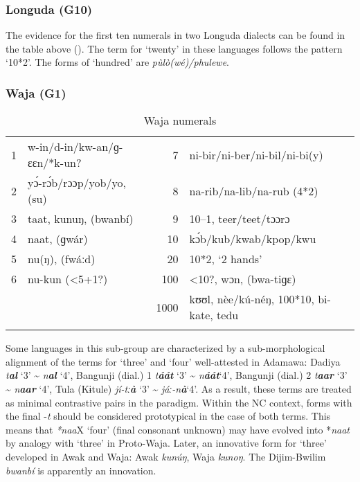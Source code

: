 \subsubsection{Longuda (G10)}%
The evidence for the first ten numerals in two Longuda dialects can be found in the table above (). The term for ‘twenty’ in these languages follows the pattern ‘10*2’.  The forms of ‘hundred’ are \textit{pùlò(wé)/phulewe}.

\subsubsection{Waja (G1)}%
\begin{table}
\caption{\label{tab:3:114}Waja numerals}


\begin{tabularx}{\textwidth}{llrX}
\lsptoprule

1 & w-in/d-in/kw-an/ɡ-ɛɛn/*k-un? & 7 & ni-bir/ni-ber/ni-bil/ni-bi(y)\\
2 & y{\'{ɔ}}-r{\'{ɔ}}b/rɔɔp/yob/yo, (su) & 8 & na-rib/na-lib/na-rub (4*2)\\
3 & taat, kunuŋ, (bwanbí) & 9 & 10--1, teer/teet/tɔɔrɔ\\
4 & naat, (ɡwár) & 10 & k{\'{ɔ}}b/kub/kwab/kpop/kwu\\
5 & nu(ŋ), (fwáːd) & 20 & 10*2, `2 hands'\\
6 & nu-kun (<5+1?) & 100 & <10?, wɔn, (bwa-tiɡɛ)\\
&  & 1000 & kʊʊl, nèe/kú-néŋ, 100*10, bi-kate, tedu\\
\lspbottomrule
\end{tabularx}
\end{table}

Some languages in this sub-group are characterized by a sub-morphological alignment of the terms for ‘three’ and ‘four’ well-attested in Adamawa: Dadiya \textit{t}\textbf{\textit{al} }‘3’ {\textasciitilde} \textit{n}\textbf{\textit{al}} ‘4’, Bangunji (dial.) 1 \textit{t}\textbf{\textit{áát}} ‘3’ {\textasciitilde} \textit{n}\textbf{\textit{áát}}‘4’, Bangunji (dial.) 2 \textit{t}\textbf{\textit{aar}} ‘3’ {\textasciitilde} \textit{n}\textbf{\textit{aar}} ‘4’, Tula (Kɨtule) \textit{jí-tː}\textbf{\textit{à}} ‘3’ {\textasciitilde} \textit{jáː-n}\textbf{\textit{à}}‘4’. As a result, these terms are treated as minimal contrastive pairs in the paradigm.  Within the NC context, forms with the final -\textit{t} should be considered prototypical in the case of both terms. This means that \textit{*naa}X ‘four’ (final consonant unknown) may have evolved into *\textit{naat} by analogy with ‘three’ in Proto-Waja. Later, an innovative form for ‘three’ developed in Awak and Waja: Awak \textit{kunúŋ}, Waja \textit{kunoŋ}. The Dijim-Bwilim \textit{bwanbí} is apparently an innovation. 

